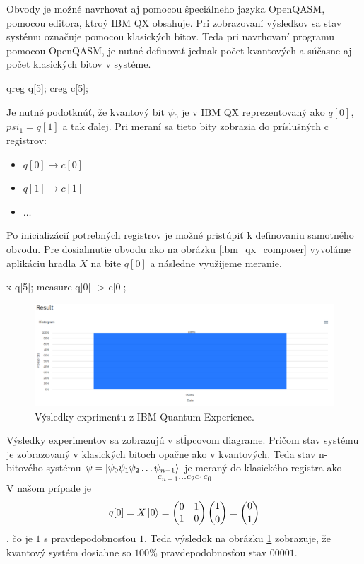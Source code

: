 Obvody je možné navrhovať aj pomocou špeciálneho jazyka OpenQASM, pomocou
editora, ktroý IBM QX obsahuje. Pri zobrazovaní výsledkov sa stav systému 
označuje pomocou klasických bitov. Teda pri navrhovaní programu pomocou
OpenQASM, je nutné definovať jednak počet kvantových a súčasne aj počet 
klasických bitov v systéme.

\begin{code}
qreg q[5];
creg c[5];
\end{code}

Je nutné podotknúť, že kvantový bit \(\psi_0\) je v IBM QX reprezentovaný
ako \(q[0]\), \(psi_1 = q[1]\) a tak ďalej. Pri meraní sa tieto bity zobrazia
do príslušných c registrov:
\begin{itemize}
\item[] \(q[0] \rightarrow c[0]\)
\item[] \(q[1] \rightarrow c[1]\)
\item[] \(\dots\)
\end{itemize}

Po inicializácií potrebných registrov je možné pristúpiť k definovaniu 
samotného obvodu. Pre dosiahnutie obvodu ako na obrázku \ref{ibm_qx_composer}
vyvoláme aplikáciu hradla \(X\) na bite \(q[0]\) a následne využijeme meranie.

\begin{code}
x q[5];
measure q[0] -> c[0];
\end{code}

\begin{figure} 
	\centering 
	\includegraphics[width=1\textwidth]{figures/ibm_qx_results.png} 
	\caption{Výsledky exprimentu z IBM Quantum Experience.}
    \label{ibm_qx_results}
\end{figure}

Výsledky experimentov sa zobrazujú v stĺpcovom diagrame. Pričom stav systému
je zobrazovaný v klasických bitoch opačne ako v kvantových. Teda stav 
n-bitového systému \(\psi = \Ket{\psi_0\psi_1\psi_2 \dots \psi_{n-1}}\) je
meraný do klasického registra ako 
\[c_{n-1} \dots c_2 c_1 c_0\]
V našom prípade je
\[q[0] = X \Ket{0} =
\begin{pmatrix}
0 & 1\\
1 & 0\\
\end{pmatrix}
\binom{1}{0} = \binom{0}{1}
\]
, čo je \(1\) s pravdepodobnosťou \(1\). Teda výsledok na obrázku 
\ref{ibm_qx_results} zobrazuje, že kvantový systém dosiahne so \(100\%\) 
pravdepodobnosťou stav \(00001\).

